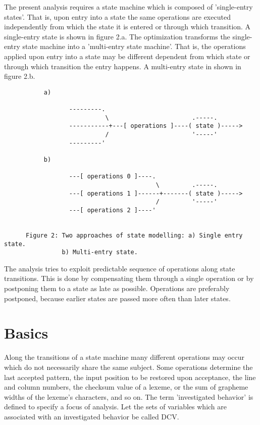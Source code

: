 \documentclass[12pt]{article}
\begin{document}
The present analysis requires a state machine which is composed of
'single-entry states'. That is, upon entry into a state the same operations are
executed independently from which the state it is entered or through which
transition.  A single-entry state is shown in figure 2.a. The optimization
transforms the single-entry state machine into a 'multi-entry state machine'.
That is, the operations applied upon entry into a state may be different
dependent from which state or through which transition the entry happens.  A
multi-entry state in shown in figure 2.b.

\begin{verbatim}
           a)
     
                  ---------.
                            \                       .-----.
                  -----------+---[ operations ]----( state )----->   
                            /                       '-----'
                  ---------'       
     
           b)
     
                  ---[ operations 0 ]----.
                                          \         .-----.
                  ---[ operations 1 ]------+-------( state )----->  
                                          /         '-----'
                  ---[ operations 2 ]----'       


      Figure 2: Two approaches of state modelling: a) Single entry state. 
                b) Multi-entry state. 

\end{verbatim}

The analysis tries to exploit predictable sequence of operations along state
transitions. This is done by compensating them through a single operation or by
postponing them to a state as late as possible.  Operations are preferably
postponed, because earlier states are passed more often than later states.

\section{Basics}

Along the transitions of a state machine many different operations may occur
which do not necessarily share the same subject. Some operations determine the
last accepted pattern, the input position to be restored upon acceptance, the
line and column numbers, the checksum value of a lexeme, or the sum of grapheme
widths of the lexeme's characters, and so on. The term 'investigated behavior'
is defined to specify a focus of analysis.  Let the sets of variables which are
associated with an investigated behavior be called DCV.
\end{document}
